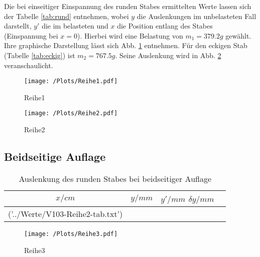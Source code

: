 Die bei einseitiger Einspannung des runden Stabes ermittelten Werte lassen sich der Tabelle \ref{tab:rund} entnehmen, wobei $y$ die Auslenkungen im unbelasteten Fall darstellt, $y'$ die im belasteten und $x$ die Position entlang des Stabes (Einspannung bei $x=0$). Hierbei wird eine Belastung von $m_1 = 379.2g$ gewählt. Ihre graphische Darstellung lässt sich Abb. \ref{fig:Reihe1} entnehmen.
Für den eckigen Stab (Tabelle \ref{tab:eckig}) ist $m_2 = 767.5g$. Seine Auslenkung wird in Abb. \ref{fig:Reihe2} veranschaulicht. 

\begin{figure}
  \centering
  \texttt{[image: /Plots/Reihe1.pdf]}
  \caption{Reihe1}
  \label{fig:Reihe1}
\end{figure}

\begin{figure}
  \centering
  \texttt{[image: /Plots/Reihe2.pdf]}
  \caption{Reihe2}
  \label{fig:Reihe2}
\end{figure}

\subsection{Beidseitige Auflage}
\label{sec:Beidseitig}

\begin{table}
  \centering
\caption{Auslenkung des runden Stabes bei beidseitiger Auflage}
\label{tab:rundBeidseitig}
\begin{tabular}{S S S S}
  \toprule
  {$x/cm$} & {$y/mm$} & {$y'/mm$} {$\delta y/mm$}\\
  \midrule
  ('../Werte/V103-Reihe2-tab.txt')
\bottomrule
\end{tabular}
\end{table}
\FloatBarrier

\begin{figure}
  \centering
  \texttt{[image: /Plots/Reihe3.pdf]}
  \caption{Reihe3}
  \label{fig:Reihe3}
\end{figure}

